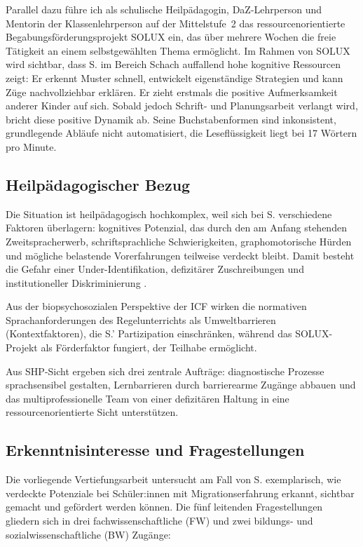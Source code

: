 \documentclass[ngerman, a4paper]{article}
\begin{document}
Parallel dazu führe ich als schulische Heilpädagogin, DaZ-Lehrperson und Mentorin der
Klassenlehrperson auf der Mittelstufe~2 das ressourcenorientierte Begabungsförderungsprojekt
SOLUX ein, das über mehrere Wochen die freie Tätigkeit an einem selbstgewählten Thema
ermöglicht. Im Rahmen von SOLUX wird sichtbar, dass S. im Bereich Schach auffallend
hohe kognitive Ressourcen zeigt: Er erkennt Muster schnell, entwickelt eigenständige
Strategien und kann Züge nachvollziehbar erklären. Er zieht erstmals die positive
Aufmerksamkeit anderer Kinder auf sich. Sobald jedoch Schrift- und Planungsarbeit
verlangt wird, bricht diese positive Dynamik ab. Seine Buchstabenformen sind inkonsistent,
grundlegende Abläufe nicht automatisiert, die Leseflüssigkeit liegt bei 17 Wörtern pro Minute.
 
\subsection*{Heilpädagogischer Bezug}
 
Die Situation ist heilpädagogisch hochkomplex, weil sich bei S. verschiedene Faktoren
überlagern: kognitives Potenzial, das durch den am Anfang stehenden Zweitspracherwerb,
schriftsprachliche Schwierigkeiten, graphomotorische Hürden und mögliche belastende
Vorerfahrungen teilweise verdeckt bleibt. Damit besteht die Gefahr einer
Under-Identifikation, defizitärer Zuschreibungen und institutioneller Diskriminierung
\parencite{kappus2010migration,stamm2012migranten}.%

Aus der biopsychosozialen Perspektive der ICF wirken die normativen
Sprachanforderungen des Regelunterrichts als Umweltbarrieren (Kontextfaktoren),
die S.' Partizipation einschränken, während das SOLUX-Projekt als Förderfaktor
fungiert, der Teilhabe ermöglicht.

Aus SHP-Sicht ergeben sich drei zentrale Aufträge: diagnostische Prozesse sprachsensibel
gestalten, Lernbarrieren durch barrierearme Zugänge abbauen und das multiprofessionelle
Team von einer defizitären Haltung in eine ressourcenorientierte Sicht unterstützen.
 
\subsection*{Erkenntnisinteresse und Fragestellungen}
 
Die vorliegende Vertiefungsarbeit untersucht am Fall von S. exemplarisch, wie verdeckte
Potenziale bei Schüler:innen mit Migrationserfahrung erkannt, sichtbar gemacht und
gefördert werden können. Die fünf leitenden Fragestellungen gliedern sich in drei
fachwissenschaftliche (FW) und zwei bildungs- und sozialwissenschaftliche (BW) Zugänge:
\end{document}
